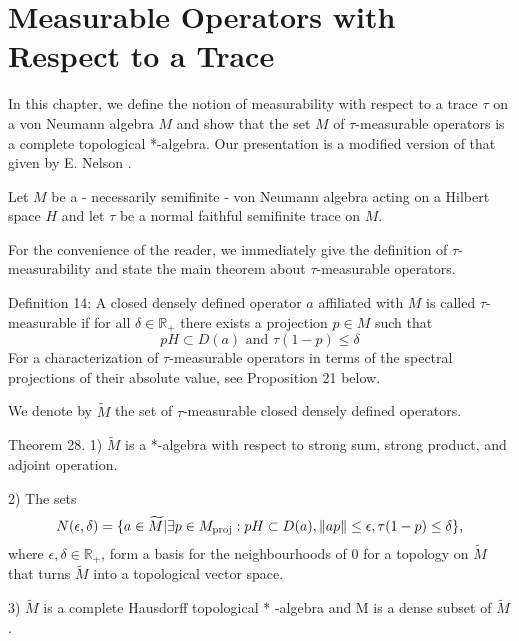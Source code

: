 
% 
\chapter{Measurable Operators with Respect to a Trace}
In this chapter, we define the notion of measurability with respect to a trace $\tau$ on a von Neumann algebra $M$ and show that the set $M$ of $\tau$-measurable operators is a complete topological *-algebra. Our presentation is a modified version of that given by E. Nelson \cite{13}.\par
Let $M$ be a - necessarily semifinite - von Neumann algebra acting on a Hilbert space $H$ and let $\tau$ be a normal faithful semifinite trace on $M$.\par
For the convenience of the reader, we immediately give the definition of $\tau$-measurability and state the main theorem about $\tau$-measurable operators.\par

Definition 14: A closed densely defined operator $a$ affiliated with $M$ is called $\tau$-measurable if for all $\delta\in \mathbb{R}_+$ there exists a projection $p\in M$ such that
\[
    pH\subset D(a)\text{ and } \tau(1-p)\leq \delta
\]
For a characterization of $\tau$-measurable operators in terms of the spectral projections of their absolute value, see Proposition 21 below.\par
We denote by $\widetilde{M}$ the set of $\tau$-measurable closed densely defined operators.\par
Theorem 28. 1) $\widetilde{M}$ is a *-algebra with respect to strong sum, strong product, and adjoint operation.\par
2) The sets
\[
    N(\epsilon,\delta)=\{a\in \widetilde{M}|\exists p\in M_{\text{proj}}:pH\subset D(a),\norm{ap}\leq \epsilon,\tau(1-p)\leq \delta\},
\]
where $\epsilon,\delta\in \mathbb{R}_+$, form a basis for the neighbourhoods of $0$ for a topology on $\widetilde{M}$ that turns $\widetilde{M}$ into a topological vector space. \par
3) $\widetilde{M}$ is a complete Hausdorff topological * -algebra and M is a dense subset of $\widetilde{M}$.\par

